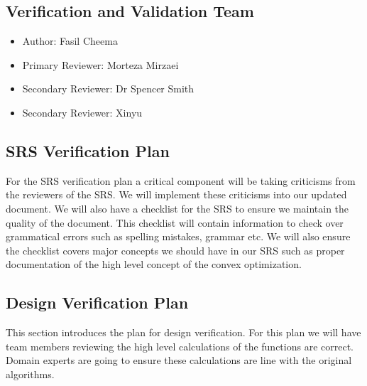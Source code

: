 \documentclass[12pt, titlepage]{article}
\begin{document}
\subsection{Verification and Validation Team}

\begin{itemize}
  \item Author: Fasil Cheema
  \item Primary Reviewer: Morteza Mirzaei
  \item Secondary Reviewer: Dr Spencer Smith
  \item Secondary Reviewer: Xinyu
\end{itemize}

\subsection{SRS Verification Plan}
For the SRS verification plan a critical component will be taking criticisms from the 
reviewers of the SRS. We will implement these criticisms into our updated document. 
We will also have a checklist for the SRS to ensure we maintain the quality of the document. 
This checklist will contain information to check over grammatical errors such as spelling mistakes,
grammar etc. We will also ensure the checklist covers major concepts we should have in our SRS such 
as proper documentation of the high level concept of the convex optimization.



\subsection{Design Verification Plan}


This section introduces the plan for design verification. For this plan we will have 
team members reviewing the high level calculations of the functions are correct.
Domain experts are going to ensure these calculations are line with the original 
algorithms.
\end{document}
